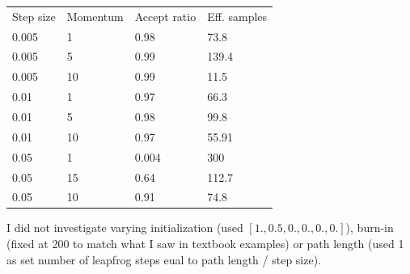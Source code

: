 \documentclass[12pt,letterpaper,twoside]{article}
\begin{document}
\begin{enumerate}[label=(\alph*)]
\begin{table}[H]
    \centering
    \begin{tabular}{llll}
        Step size    & Momentum     & Accept ratio      & Eff. samples          \\
        0.005        & 1            & 0.98              & 73.8                  \\ 
        0.005        & 5            & 0.99              & 139.4                 \\
        0.005        & 10           & 0.99              & 11.5                  \\
        0.01         & 1            & 0.97              & 66.3                  \\
        0.01         & 5            & 0.98              & 99.8                  \\
        0.01         & 10           & 0.97              & 55.91                 \\
        0.05         & 1            & 0.004             & 300                   \\
        0.05         & 15           & 0.64              & 112.7                 \\
        0.05         & 10           & 0.91              & 74.8                  \\      
    \end{tabular}
\end{table}

I did not investigate varying initialization (used $[1., 0.5, 0., 0., 0., 0.]$), 
burn-in (fixed at 200 to match what I saw in textbook examples) or path length
(used 1 as set number of leapfrog steps eual to path length / step size).
\end{enumerate}
\end{document}

